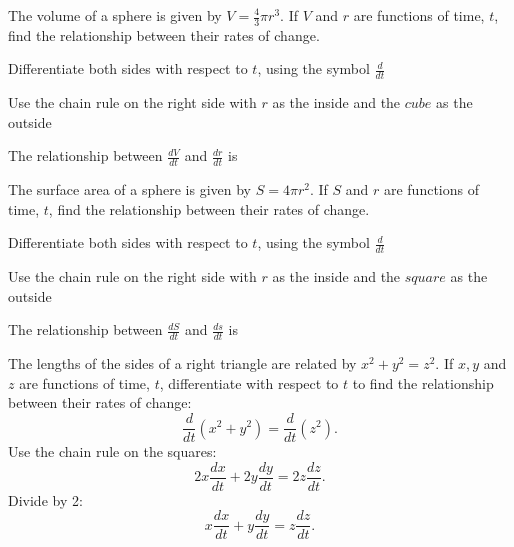 \documentclass{ximera}
\begin{document}
\begin{question}
The volume of a sphere is given by $V = \tfrac{4}{3}\pi r^3$. If $V$ and $r$ are functions of time, $t$,
find the relationship between their rates of change.\\
\begin{hint}
Differentiate both sides with respect to $t$, using the symbol $\frac{d}{dt}$
\end{hint}
\begin{hint}
Use the chain rule on the right side with $r$ as the inside and the $cube$ as the outside
\end{hint}

The relationship between $\frac{dV}{dt}$ and $\frac{dr}{dt}$ is
\begin{multipleChoice}
\end{multipleChoice}
\end{question}


\begin{question}
The surface area of a sphere is given by $S = 4\pi r^2$. If $S$ and $r$ are functions of time, $t$, 
find the relationship between their rates of change.\\
\begin{hint}
Differentiate both sides with respect to $t$, using the symbol $\frac{d}{dt}$
\end{hint}
\begin{hint}
Use the chain rule on the right side with $r$ as the inside and the $square$ as the outside
\end{hint}

The relationship between $\frac{dS}{dt}$ and $\frac{ds}{dt}$ is
\begin{multipleChoice}
\end{multipleChoice}
\end{question}



\begin{example}
The lengths of the sides of a right triangle are related by $x^2 + y^2 = z^2$. 
If $x, y$ and $z$ are functions of time, $t$, 
differentiate with respect to $t$ to find the relationship between their rates of change:
\[\frac{d}{dt} (x^2 + y^2 ) = \frac{d}{dt}( z^2).\]
Use the chain rule on the squares:
\[2x\frac{dx}{dt} + 2y\frac{dy}{dt} = 2z\frac{dz}{dt}.\]
Divide by 2:
\[x\frac{dx}{dt} + y\frac{dy}{dt} = z\frac{dz}{dt}.\]
\end{example}
\end{document}

